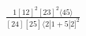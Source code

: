 \documentclass[varwidth, border=5pt]{standalone}
\begin{document}
\begin{my}
$\begin{gathered}
\scriptscriptstyle\frac{1[12]^2[23]^2⟨45⟩}{[24][25]⟨2|1+5|2]^2}
\end{gathered}$
\end{my}
\end{document}
